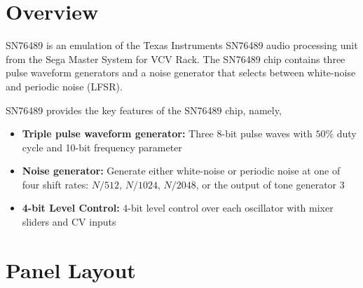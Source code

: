 \documentclass[12pt,a4paper]{article}
\begin{document}


\section{Overview}

SN76489 is an emulation of the Texas Instruments SN76489 audio processing unit from the Sega Master System for VCV Rack. The SN76489 chip contains three pulse waveform generators and a noise generator that selects between white-noise and periodic noise (LFSR).

SN76489 provides the key features of the SN76489 chip, namely,
\begin{itemize}
  \item \textbf{Triple pulse waveform generator:} Three 8-bit pulse waves with $50\%$ duty cycle and 10-bit frequency parameter
  \item \textbf{Noise generator:} Generate either white-noise or periodic noise at one of four shift rates: $N/512$, $N/1024$, $N/2048$, or the output of tone generator 3
  \item \textbf{4-bit Level Control:} 4-bit level control over each oscillator with mixer sliders and CV inputs
\end{itemize}


\clearpage
\section{Panel Layout}
\end{document}
